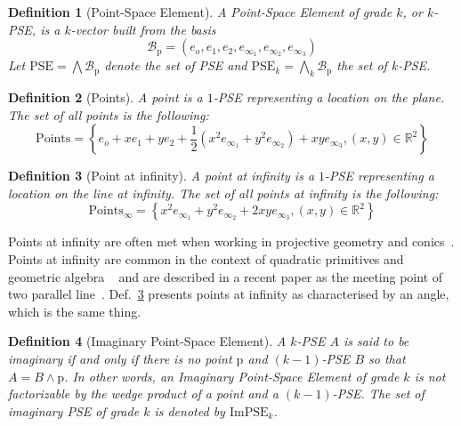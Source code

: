 \documentclass{birkjour}
\newtheorem{definition}{Definition}
\begin{document}
\begin{definition}[Point-Space Element]
A Point-Space Element of grade \(k\), or \(k\)-PSE, is a \(k\)-vector built from the basis
\begin{equation}
    \mathcal{B}_\mathrm{p} = \left(e_o, e_1, e_2, e_{\infty_1}, e_{\infty_2}, e_{\infty_3}\right)
\end{equation}
Let \(\mathrm{PSE} = \bigwedge \mathcal{B}_\mathrm{p}\) denote the set of PSE and \(\mathrm{PSE}_k = \bigwedge_k \mathcal{B}_\mathrm{p}\) the set of \(k\)-PSE.
\label{def:Bp}
\end{definition}
\begin{definition}[Points]
A point is a \(1\)-PSE representing a location on the plane. The set of all points is the following:
\begin{equation}
\mathrm{Points} = \left\{e_o + x e_1 + y e_2 + \frac{1}{2}\left(x^2 e_{\infty_1} + y^2  e_{\infty_2}\right) + xy e_{\infty_3}, (x,y)\in\mathbb{R}^2\right\}
\end{equation}
\end{definition}
\begin{definition}[Point at infinity]\label{def:pt_inf}
A point at infinity is a \(1\)-PSE representing a location on the line at infinity. The set of all points at infinity is the following:
\begin{equation}
    \mathrm{Points}_{\infty} = \left\{x^2 e_{\infty_1} + y^2 e_{\infty_2} + 2 xy e_{\infty_3}, (x,y)\in\mathbb{R}^2\right\}
\end{equation}
\end{definition}
Points at infinity are often met when working in projective geometry and conics~\cite{richter-gebert_perspectives_2011}. Points at infinity are common in the context of quadratic primitives and geometric algebra ~\cite{hrdina_geometric_2018,breuils_three-dimensional_2019} and are described in a recent paper as the meeting point of two parallel line~\cite{2024-01-09louckaAlgorithmsConicFitting}. Def.~\ref{def:pt_inf} presents points at infinity as characterised by an angle, which is the same thing.
\begin{definition}[Imaginary Point-Space Element]
A \(k\)-PSE \(A\) is said to be imaginary if and only if there is no point \(\mathrm{p}\) and \((k-1)\)-PSE \(B\) so that \({A=B\wedge\mathrm{p}}\).
In other words, an Imaginary Point-Space Element of grade \(k\) is not factorizable by the wedge product of a point and a \((k-1)\)-PSE.
The set of imaginary PSE of grade \(k\) is denoted by \(\mathrm{ImPSE}_k\).
\end{definition}
\end{document}
